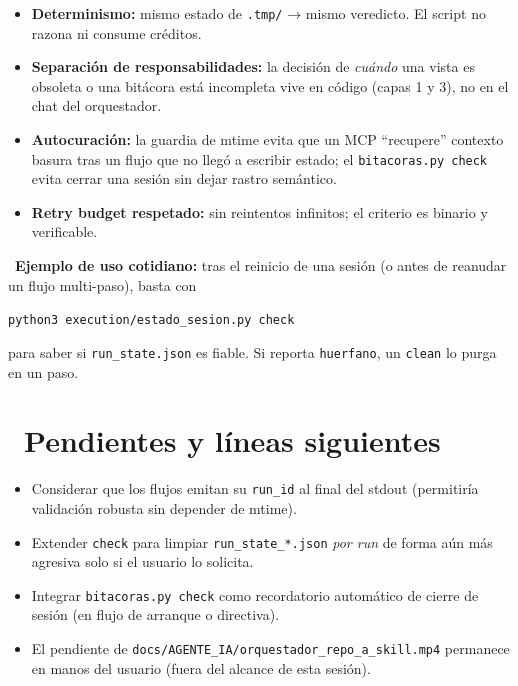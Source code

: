 \documentclass[11pt,a4paper]{article}
\newcommand{\iconotexto}[2]{\textcolor{cyanNeon}{\faIcon{#1}}~#2}
\begin{document}
\begin{itemize}%
  \item \textbf{Determinismo:} mismo estado de \texttt{.tmp/} → mismo veredicto. El
        script no razona ni consume créditos.
  \item \textbf{Separación de responsabilidades:} la decisión de \emph{cuándo} una
        vista es obsoleta o una bitácora está incompleta vive en código (capas 1 y 3),
        no en el chat del orquestador.
  \item \textbf{Autocuración:} la guardia de mtime evita que un MCP ``recupere''
        contexto basura tras un flujo que no llegó a escribir estado; el
        \texttt{bitacoras.py check} evita cerrar una sesión sin dejar rastro semántico.
  \item \textbf{Retry budget respetado:} sin reintentos infinitos; el criterio es
        binario y verificable.
\end{itemize}

\begin{cajaEjemplo}
~\textbf{Ejemplo de uso cotidiano:} tras el reinicio de una sesión (o
antes de reanudar un flujo multi-paso), basta con
\begin{center}
\texttt{python3 execution/estado\_sesion.py check}
\end{center}
para saber si \texttt{run\_state.json} es fiable. Si reporta \texttt{huerfano}, un
\texttt{clean} lo purga en un paso.
\end{cajaEjemplo}

\section{\iconotexto{list}{Pendientes y líneas siguientes}}

\begin{itemize}[leftmargin=*]
  \item Considerar que los flujos emitan su \texttt{run\_id} al final del stdout
        (permitiría validación robusta sin depender de mtime).
  \item Extender \texttt{check} para limpiar \texttt{run\_state\_*.json} \emph{por
        run} de forma aún más agresiva solo si el usuario lo solicita.
  \item Integrar \texttt{bitacoras.py check} como recordatorio automático de cierre
        de sesión (en flujo de arranque o directiva).
  \item El pendiente de \texttt{docs/AGENTE\_IA/orquestador\_repo\_a\_skill.mp4}
        permanece en manos del usuario (fuera del alcance de esta sesión).
\end{itemize}
\end{document}
